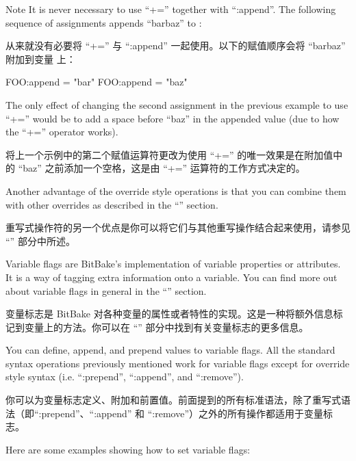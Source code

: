 \begin{noteblock}{Note}%
It is never necessary to use ``+='' together with ``:append''. The following sequence of assignments appends ``barbaz'' to :

\medskip
从来就没有必要将 ``+='' 与 ``:append'' 一起使用。以下的赋值顺序会将 ``barbaz'' 附加到变量  上：

\medskip
\begin{pyglist}
FOO:append = "bar"
FOO:append = "baz"
\end{pyglist}

\medskip
The only effect of changing the second assignment in the previous example to use ``+='' would be to add a space before ``baz'' in the appended value (due to how the ``+='' operator works).

\medskip
将上一个示例中的第二个赋值运算符更改为使用 ``+='' 的唯一效果是在附加值中的 ``baz'' 之前添加一个空格，这是由 ``+='' 运算符的工作方式决定的。
\end{noteblock}

Another advantage of the override style operations is that you can combine them with other overrides as described in the ``'' section.

重写式操作符的另一个优点是你可以将它们与其他重写操作结合起来使用，请参见 ``'' 部分中所述。


\label{section:Variable Flag Syntax}

Variable flags are BitBake's implementation of variable properties or attributes. It is a way of tagging extra information onto a variable. You can find more out about variable flags in general in the ``'' section.

变量标志是 BitBake 对各种变量的属性或者特性的实现。这是一种将额外信息标记到变量上的方法。你可以在 ``'' 部分中找到有关变量标志的更多信息。


You can define, append, and prepend values to variable flags. All the standard syntax operations previously mentioned work for variable flags except for override style syntax (i.e. ``:prepend'', ``:append'', and ``:remove'').

你可以为变量标志定义、附加和前置值。前面提到的所有标准语法，除了重写式语法（即``:prepend''、``:append'' 和 ``:remove''）之外的所有操作都适用于变量标志。

Here are some examples showing how to set variable flags:

